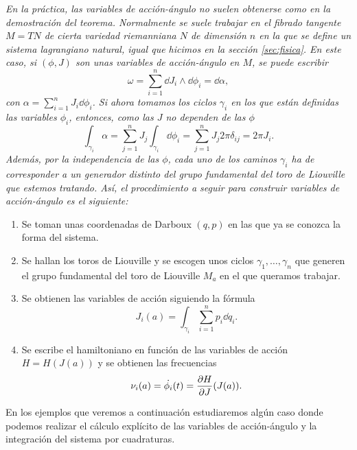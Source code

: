 \begin{obs}
  \em
  En la práctica, las variables de acción-ángulo no suelen obtenerse como en la demostración del teorema. Normalmente se suele trabajar en el fibrado tangente $M=TN$ de cierta variedad riemanniana $N$ de dimensión $n$ en la que se define un sistema lagrangiano natural, igual que hicimos en la sección \ref{sec:fisica}. En este caso, si $(\phi,J)$ son unas variables de acción-ángulo en $M$, se puede escribir
\begin{equation*}
  \omega=\sum_{i=1}^n \dd J_i \wedge \dd \phi_i = \dd \alpha,
\end{equation*}
con $\alpha=\sum_{i=1}^n J_i \dd \phi_i$. Si ahora tomamos los ciclos $\gamma_i$ en los que están definidas las variables $\phi_i$, entonces, como las $J$ no dependen de las $\phi$
\begin{equation*}
  \int_{\gamma_i} \alpha = \sum_{j=1}^n J_j \int_{\gamma_i}\dd \phi_i = \sum_{j=1}^n J_j 2\pi \delta_{ij}= 2\pi J_i.
\end{equation*}
Además, por la independencia de las $\phi$, cada uno de los caminos $\gamma_i$ ha de corresponder a un generador distinto del grupo fundamental del toro de Liouville que estemos tratando.
Así, el procedimiento a seguir para construir variables de acción-ángulo es el siguiente:
\begin{enumerate}
  \item Se toman unas coordenadas de Darboux $(q,p)$ en las que ya se conozca la forma del sistema.
  \item Se hallan los toros de Liouville y se escogen unos ciclos $\gamma_1,\dots,\gamma_n$ que generen el grupo fundamental del toro de Liouville $M_a$ en el que queramos trabajar.
  \item Se obtienen las variables de acción siguiendo la fórmula
    \begin{equation*}
      J_i(a)=\int_{\gamma_i} \sum_{i=1}^n p_i \dd q_i.
    \end{equation*}
  \item Se escribe el hamiltoniano en función de las variables de acción $H=H(J(a))$ y se obtienen las frecuencias 
    \begin{equation*}
      \nu_i(a)= \dot{\phi_i}(t)=\frac{\partial H}{\partial J}(J(a)).
    \end{equation*}
\end{enumerate}
\end{obs}

En los ejemplos que veremos a continuación estudiaremos algún caso donde podemos realizar el cálculo explícito de las variables de acción-ángulo y la integración del sistema por cuadraturas.

